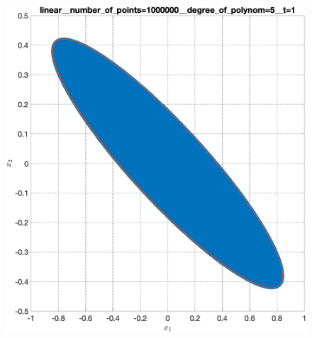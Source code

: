 \documentclass[../main.tex]{subfiles}
\begin{document}
\begin{figure}[ht!]
\begin{minipage}[b]{.3\linewidth}
  	\end{minipage} 
  	\vfill
  	\begin{minipage}[b]{.3\linewidth} 
  		\small
  		\centering 
  		\includegraphics[width=\linewidth]{images/linear__number_of_points=1000000__degree_of_polynom=5__t=1.eps}
  		\label{fig:ap:linearN106k5T1}
  	\end{minipage}
  	\hfill
  	\begin{minipage}[b]{.3\linewidth} 
  		\small
  		\centering

\end{minipage}
\end{figure}
\end{document}
